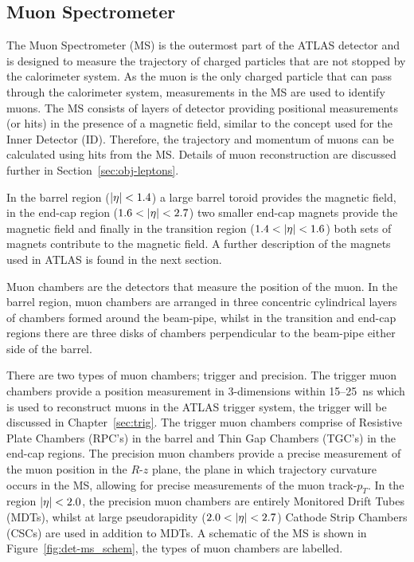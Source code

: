 \subsection{Muon Spectrometer}
\label{sec:det-MS}

The Muon Spectrometer (MS) is the outermost part of the ATLAS detector and is designed to measure the trajectory
of charged particles that are not stopped by the calorimeter system.
As the muon is the only charged particle that can pass through the calorimeter system,
measurements in the MS are used to identify muons.
The MS consists of layers of detector providing positional measurements (or hits)
in the presence of a magnetic field, similar to the concept used for the Inner Detector (ID).
Therefore, the trajectory and momentum of muons can be calculated using hits from the MS.
Details of muon reconstruction are discussed further in Section~\ref{sec:obj-leptons}.

In the barrel region ($|\eta|\nobreak<\nobreak1.4$) a large barrel toroid provides the magnetic field,
in the end-cap region ($1.6\nobreak<\nobreak|\eta|\nobreak<\nobreak2.7$) two smaller end-cap magnets  provide the magnetic field
and finally in the transition region ($1.4\nobreak<\nobreak|\eta|\nobreak<\nobreak1.6$) both sets of magnets contribute to the magnetic field.
A further description of the magnets used in ATLAS is found in the next section. 

Muon chambers are the detectors that measure the position of the muon.
In the barrel region,  muon chambers are arranged in three concentric cylindrical layers of chambers formed around the beam-pipe,
whilst in the transition and end-cap regions there are three disks of chambers perpendicular to the beam-pipe either side of the barrel.

There are two types of muon chambers; trigger and precision.
The trigger muon chambers provide a position measurement in 3-dimensions within 15--\SI{25}{\nano\second} which is used to reconstruct muons in the ATLAS trigger system,
the trigger will be discussed in Chapter~\ref{sec:trig}.
The trigger muon chambers comprise of Resistive Plate Chambers (RPC’s) in the barrel 
and Thin Gap Chambers (TGC’s) in the end-cap regions.
The precision muon chambers provide a precise measurement of the muon position in the $R$-$z$ plane,
the plane in which trajectory curvature occurs in the MS, allowing for precise measurements of the muon track-$p_T$. 
In the region $|\eta|\nobreak<\nobreak2.0$, the precision muon chambers are entirely Monitored Drift Tubes (MDTs),
whilst at large pseudorapidity ($2.0\nobreak<\nobreak|\eta|\nobreak<\nobreak2.7$) Cathode Strip Chambers (CSCs) are used in addition to MDTs.
A schematic of the MS is shown in Figure~\ref{fig:det-ms_schem}, the types of muon chambers are labelled.

